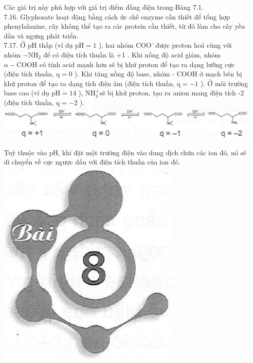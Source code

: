 \documentclass[10pt]{article}
\begin{document}
Các giá trị này phù hợp với giá trị điểm đẳng điện trong-Bảng 7.1.\\
7.16. Glyphosate hoạt động bằng cách ức chế enzyme cần thiết để tổng hợp phenylalanine, cây không thể tạo ra các protein cần thiết, từ đó làm cho cây yếu dần và ngưng phát triển.\\
7.17. Ở pH thấp (ví dụ $\mathrm{pH}=1$ ), hai nhóm $\mathrm{COO}^{-}$được proton hoá cùng với nhóm $-\mathrm{NH}_{2}$ để có điện tích thuần là +1 . Khi nồng độ acid giảm, nhóm\\
$\alpha-\mathrm{COOH}$ có tính acid mạnh hơn sẽ bị khử proton để tạo ra dạng lưỡng cực (điện tích thuần, $\mathrm{q}=0$ ). Khi tăng nồng độ base, nhóm - COOH ở mạch bên bị khử proton để tạo ra dạng tích điện âm (điện tích thuần, $\mathrm{q}=-1$ ). Ở môi trường base cao (ví dụ $\mathrm{pH}=14$ ), $\mathrm{NH}_{3}^{+}$sẽ bị khử proton, tạo ra anion mang điện tích -2 (điện tích thuần, $\mathrm{q}=-2$ ).\\
\includegraphics[max width=\textwidth, center]{2025_10_23_b4e16b74380d0f7e7700g-052}

Tuỳ thuộc vào pH, khi đặt một trường điện vào dung dịch chứa các ion đó, nó sẽ di chuyển về cực ngược dấu với điện tích thuần của ion đó.\\
\includegraphics[max width=\textwidth, center]{2025_10_23_b4e16b74380d0f7e7700g-052(1)}
\end{document}
